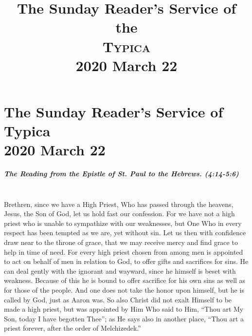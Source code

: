 \documentclass[twoside, letterpaper, 12pt]{report}
\title{The Sunday Reader's Service of the \\ \textsc{Typica} \\  2020 March 22}
\date{}
\author{}
\begin{document}
\maketitle
\pagestyle{empty} %
\cleardoublepage
\pagestyle{plain}
\setcounter{page}{1} %
\chapter*{The Sunday Reader's Service of Typica\\ 2020 March 22}

\trisagionNeedsAmen
{}







\paragraph{The Reading from the Epistle of St. Paul to the Hebrews. (4:14-5:6)}\mbox{}\\

Brethren, since we have a High Priest, Who has passed through the heavens, Jesus, the Son
of God, let us hold fast our confession. For we have not a high priest who is unable to sympathize
with our weaknesses, but One Who in every respect has been tempted as we are, yet without sin.
Let us then with confidence draw near to the throne of grace, that we may receive mercy and find
grace to help in time of need. For every high priest chosen from among men is appointed to act on
behalf of men in relation to God, to offer gifts and sacrifices for sins. He can deal gently with the
ignorant and wayward, since he himself is beset with weakness. Because of this he is bound to
offer sacrifice for his own sins as well as for those of the people. And one does not take the honor
upon himself, but he is called by God, just as Aaron was. So also Christ did not exalt Himself to
be made a high priest, but was appointed by Him Who said to Him, “Thou art My Son, today I
have begotten Thee”; as He says also in another place, “Thou art a priest forever, after the order
of Melchizedek.”
\end{document}
